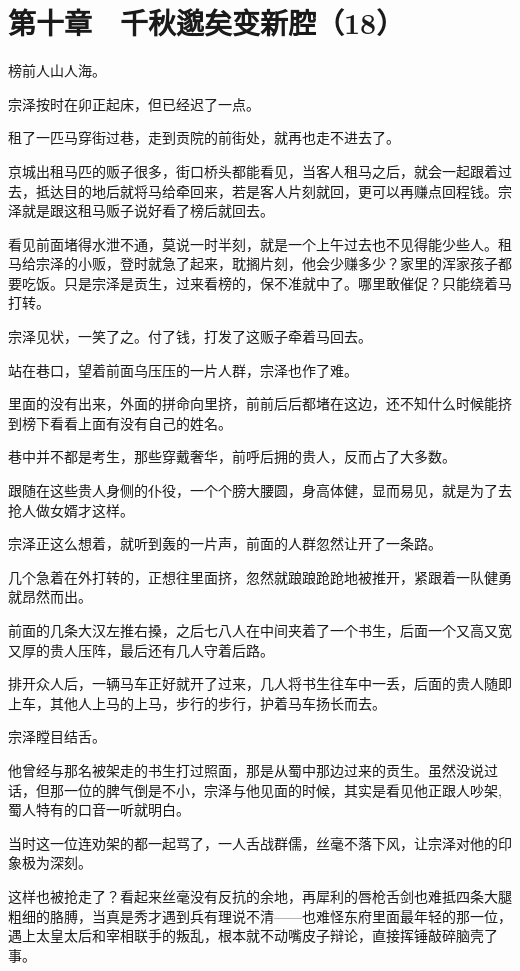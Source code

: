 \section{第十章　千秋邈矣变新腔（18）}

榜前人山人海。

宗泽按时在卯正起床，但已经迟了一点。

租了一匹马穿街过巷，走到贡院的前街处，就再也走不进去了。

京城出租马匹的贩子很多，街口桥头都能看见，当客人租马之后，就会一起跟着过去，抵达目的地后就将马给牵回来，若是客人片刻就回，更可以再赚点回程钱。宗泽就是跟这租马贩子说好看了榜后就回去。

看见前面堵得水泄不通，莫说一时半刻，就是一个上午过去也不见得能少些人。租马给宗泽的小贩，登时就急了起来，耽搁片刻，他会少赚多少？家里的浑家孩子都要吃饭。只是宗泽是贡生，过来看榜的，保不准就中了。哪里敢催促？只能绕着马打转。

宗泽见状，一笑了之。付了钱，打发了这贩子牵着马回去。

站在巷口，望着前面乌压压的一片人群，宗泽也作了难。

里面的没有出来，外面的拼命向里挤，前前后后都堵在这边，还不知什么时候能挤到榜下看看上面有没有自己的姓名。

巷中并不都是考生，那些穿戴奢华，前呼后拥的贵人，反而占了大多数。

跟随在这些贵人身侧的仆役，一个个膀大腰圆，身高体健，显而易见，就是为了去抢人做女婿才这样。

宗泽正这么想着，就听到轰的一片声，前面的人群忽然让开了一条路。

几个急着在外打转的，正想往里面挤，忽然就踉踉跄跄地被推开，紧跟着一队健勇就昂然而出。

前面的几条大汉左推右搡，之后七八人在中间夹着了一个书生，后面一个又高又宽又厚的贵人压阵，最后还有几人守着后路。

排开众人后，一辆马车正好就开了过来，几人将书生往车中一丢，后面的贵人随即上车，其他人上马的上马，步行的步行，护着马车扬长而去。

宗泽瞠目结舌。

他曾经与那名被架走的书生打过照面，那是从蜀中那边过来的贡生。虽然没说过话，但那一位的脾气倒是不小，宗泽与他见面的时候，其实是看见他正跟人吵架,蜀人特有的口音一听就明白。

当时这一位连劝架的都一起骂了，一人舌战群儒，丝毫不落下风，让宗泽对他的印象极为深刻。

这样也被抢走了？看起来丝毫没有反抗的余地，再犀利的唇枪舌剑也难抵四条大腿粗细的胳膊，当真是秀才遇到兵有理说不清——也难怪东府里面最年轻的那一位，遇上太皇太后和宰相联手的叛乱，根本就不动嘴皮子辩论，直接挥锤敲碎脑壳了事。

